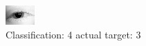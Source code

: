 \begin{figure}[h!]
\begin{center}
\includegraphics[width=0.60\columnwidth]{figures/ID48_class_4_target_3.png}
\end{center}
\caption{ Classification: 4 actual target: 3}
\label{fig:ID48_class_4_target_3}
\end{figure}
